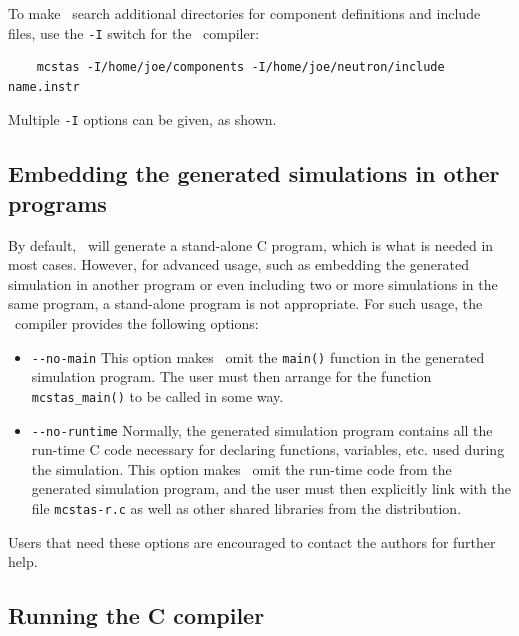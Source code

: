 To make \MCS\ search additional directories for component definitions
and include files, use the \verb+-I+ switch for the \MCS\ compiler:
\begin{verbatim}
    mcstas -I/home/joe/components -I/home/joe/neutron/include name.instr
\end{verbatim}
Multiple \verb+-I+ options can be given, as shown.


\subsection{Embedding the generated simulations in other programs}

By default, \MCS\ will generate a stand-alone C program, which is what is needed
in most cases. However, for advanced usage, such as embedding the generated
simulation in another program or even including two or more simulations in the
same program, a stand-alone program is not appropriate. For such usage, the
\MCS\ compiler provides the following options:
\begin{itemize}
\item \verb+--no-main+ This option makes \MCS\ omit the \verb+main()+ function
  in the generated simulation program. The user must then arrange for the
  function \verb+mcstas_main()+ to be called in some way.
\item \verb+--no-runtime+ Normally, the
  generated simulation program contains all the run-time C code necessary for
  declaring functions, variables, etc. used during the simulation.  This
  option makes \MCS\ omit the run-time code from the generated
  simulation program, and the user must then explicitly link with the file
  \verb+mcstas-r.c+ as well as other shared libraries from the \MCS{} distribution.
\end{itemize}
Users that need these options are encouraged to contact the authors for further
help.


\subsection{Running the C compiler}
\label{s:compile}

